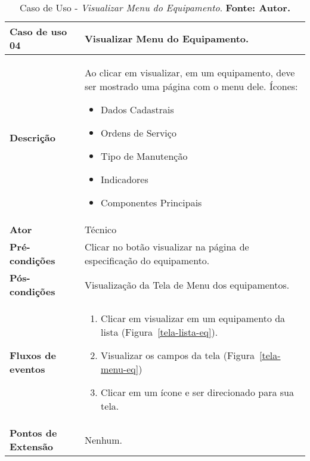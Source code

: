 \begin{apendicesenv}

\begin{table}[H]
\centering
\caption{Caso de Uso - \textit{Visualizar Menu do Equipamento}. \textbf{Fonte: Autor.}}
\label{uc04}
\begin{tabular}{ | p{5cm} | p{10cm} |  }
\hline
	\textbf{Caso de uso 04} & Visualizar Menu do Equipamento. \\ \hline
	\textbf{Descrição} & Ao clicar em visualizar, em um equipamento, deve ser mostrado uma página com o menu dele. Ícones: \begin{itemize}
															                    \item Dados Cadastrais
															                    \item Ordens de Serviço 
															                    \item Tipo de Manutenção 
															                    \item Indicadores 
															                    \item Componentes Principais
															                    \end{itemize} \\ \hline
	\textbf{Ator} & Técnico \\ \hline
	\textbf{Pré-condições} & Clicar no botão visualizar na página de especificação do equipamento. \\ \hline
	\textbf{Pós-condições} & Visualização da Tela de Menu dos equipamentos. \\ \hline
	\textbf{Fluxos de eventos} & \begin{enumerate}
									\item Clicar em visualizar em um equipamento da lista (Figura~\ref{tela-lista-eq}).    
									\item Visualizar os campos da tela (Figura~\ref{tela-menu-eq})
							        \item Clicar em um ícone e ser direcionado para sua tela.
								 \end{enumerate}   \\ \hline
	\textbf{Pontos de Extensão} & Nenhum. \\ \hline
\end{tabular}
\end{table}



\end{apendicesenv}
